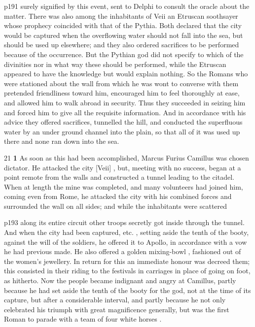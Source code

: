 p191 surely signified by this event, sent to Delphi to consult the oracle about the matter. There was also among the inhabitants of Veii an Etruscan soothsayer whose prophecy coincided with that of the Pythia. Both declared that the city would be captured when the overflowing water should not fall into the sea, but should be used up elsewhere; and they also ordered sacrifices to be performed because of the occurrence. But the Pythian god did not specify to which of the divinities nor in what way these should be performed, while the Etruscan appeared to have the knowledge but would explain nothing. So the Romans who were stationed about the wall from which he was wont to converse with them pretended friendliness toward him, encouraged him to feel thoroughly at ease, and allowed him to walk abroad in security. Thus they succeeded in seizing him and forced him to give all the requisite information. And in accordance with his advice they offered sacrifices, tunnelled the hill, and conducted the superfluous water by an under ­ground channel into the plain, so that all of it was used up there and none ran down into the sea.

21
\textbf{1} As soon as this had been accomplished, Marcus Furius Camillus was chosen dictator. He attacked the city [Veii] , but, meeting with no success, began at a point remote from the walls and constructed a tunnel leading to the citadel. When at length the mine was completed, and many volunteers had joined him, coming even from Rome, he attacked the city with his combined forces and surrounded the wall on all sides; and while the inhabitants were scattered

p193 along its entire circuit other troops secretly got inside through the tunnel. And when the city had been captured, etc. , setting aside the tenth of the booty, against the will of the soldiers, he offered it to Apollo, in accordance with a vow he had previous made. He also offered a golden mixing-bowl , fashioned out of the women's jewellery. In return for this an immediate honour was decreed them; this consisted in their riding to the festivals in carriages in place of going on foot, as hitherto. Now the people became indignant and angry at Camillus, partly because he had set aside the tenth of the booty for the god, not at the time of its capture, but after a considerable interval, and partly because he not only celebrated his triumph with great magnificence generally, but was the first Roman to parade with a team of four white horses .

